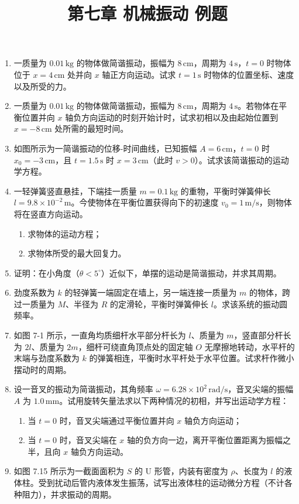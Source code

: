 \documentclass{article}
\begin{document}
\title{第七章 机械振动 例题}
\maketitle

\begin{enumerate}
\item 一质量为 $0.01\,\mathrm{kg}$ 的物体做简谐振动，振幅为 $8\,\mathrm{cm}$，周期为 $4\,\mathrm{s}$，$t=0$ 时物体位于 $x=4\,\mathrm{cm}$ 处并向 $x$ 轴正方向运动。试求 $t=1\,\mathrm{s}$ 时物体的位置坐标、速度以及所受的力。

\item 一质量为 $0.01\,\mathrm{kg}$ 的物体做简谐振动，振幅为 $8\,\mathrm{cm}$，周期为 $4\,\mathrm{s}$。若物体在平衡位置并向 $x$ 轴负方向运动的时刻开始计时，试求初相以及由起始位置到 $x=-8\,\mathrm{cm}$ 处所需的最短时间。

\item 如图所示为一简谐振动的位移-时间曲线，已知振幅 $A=6\,\mathrm{cm}$，$t=0$ 时 $x_0=-3\,\mathrm{cm}$，且 $t=1.5\,\mathrm{s}$ 时 $x=3\,\mathrm{cm}$（此时 $v>0$）。试求该简谐振动的运动学方程。

\item 一轻弹簧竖直悬挂，下端挂一质量 $m=0.1\,\mathrm{kg}$ 的重物，平衡时弹簧伸长 $l=9.8\times 10^{-2}\,\mathrm{m}$。今使物体在平衡位置获得向下的初速度 $v_0=1\,\mathrm{m/s}$，则物体将在竖直方向运动。
\begin{enumerate}
\item 求物体的运动方程；
\item 求物体所受的最大回复力。
\end{enumerate}

\item 证明：在小角度（$\theta<5^\circ$）近似下，单摆的运动是简谐振动，并求其周期。

\item 劲度系数为 $k$ 的轻弹簧一端固定在墙上，另一端连接一质量为 $m$ 的物体，跨过一质量为 $M$、半径为 $R$ 的定滑轮，平衡时弹簧伸长 $l$。求该系统的振动圆频率。

\item 如图 7-1 所示，一直角均质细杆水平部分杆长为 $l$、质量为 $m$，竖直部分杆长为 $2l$、质量为 $2m$，细杆可绕直角顶点处的固定轴 $O$ 无摩擦地转动，水平杆的末端与劲度系数为 $k$ 的弹簧相连，平衡时水平杆处于水平位置。试求杆作微小摆动时的周期。

\item 设一音叉的振动为简谐振动，其角频率 $\omega=6.28\times 10^{2}\,\mathrm{rad/s}$，音叉尖端的振幅 $A$ 为 $1.0\,\mathrm{mm}$。试用旋转矢量法求以下两种情况的初相，并写出运动学方程：
\begin{enumerate}
\item 当 $t=0$ 时，音叉尖端通过平衡位置并向 $x$ 轴负方向运动；
\item 当 $t=0$ 时，音叉尖端在 $x$ 轴的负方向一边，离开平衡位置距离为振幅之半，且向 $x$ 轴负方向运动。
\end{enumerate}

\item 如图 7.15 所示为一截面面积为 $S$ 的 U 形管，内装有密度为 $\rho$、长度为 $l$ 的液体柱。受到扰动后管内液体发生振荡，试写出液体柱的运动微分方程（不计各种阻力），并求振动的周期。

\end{enumerate}
\end{document}

